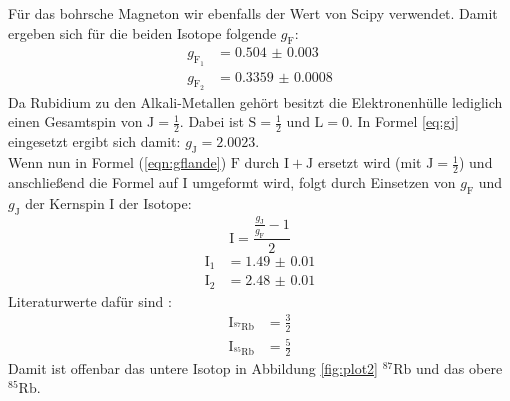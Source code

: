 \documentclass[
  bibliography=totoc,     %
  captions=tableheading,  %
  titlepage=firstiscover, %
]{scrartcl}
\begin{document}
\noindent
Für das bohrsche Magneton wir ebenfalls der Wert von Scipy \cite{scipyconst} verwendet.
Damit ergeben sich für die beiden Isotope folgende $g_\mathup{F}$:
\begin{align*}
  g_{\mathup{F}_1} &= \num{0.504(3)}\\
  g_{\mathup{F}_2} &= \num{0.3359(8)}
\end{align*}
\noindent
Da Rubidium zu den Alkali-Metallen gehört besitzt die Elektronenhülle lediglich
einen Gesamtspin von $\mathup{J} = \frac{1}{2}$. Dabei ist $\mathup{S} = \frac{1}{2}$
und $\mathup{L} = 0$. In Formel \ref{eq:gj} eingesetzt ergibt sich damit:
$g_\mathup{J} = \num{2.0023}$.\\
Wenn nun in Formel (\ref{eqn:gflande}) $\mathup{F}$ durch $\mathup{I}+\mathup{J}$
ersetzt wird (mit $\mathup{J} = \frac{1}{2}$) und anschließend die Formel auf $\mathup{I}$ umgeformt wird,
folgt durch Einsetzen von $g_\mathup{F}$ und $g_\mathup{J}$ der Kernspin $\mathup{I}$
der Isotope:
\begin{equation}
  \mathup{I} = \frac{\frac{g_\mathup{J}}{g_\mathup{F}}-1}{2}
\end{equation}
\begin{align*}
  \mathup{I}_1 &= \num{1.49(1)}\\
  \mathup{I}_2 &= \num{2.48(1)}
\end{align*}
Literaturwerte dafür sind \cite{rubwi}:
\begin{align*}
  \mathup{I}_{^{87}\mathup{Rb}} &= \frac{3}{2}\\
  \mathup{I}_{^{85}\mathup{Rb}} &= \frac{5}{2}
\end{align*}
Damit ist offenbar das untere Isotop in Abbildung \ref{fig:plot2} $^{87}\mathup{Rb}$
und das obere $^{85}\mathup{Rb}$.
\end{document}
